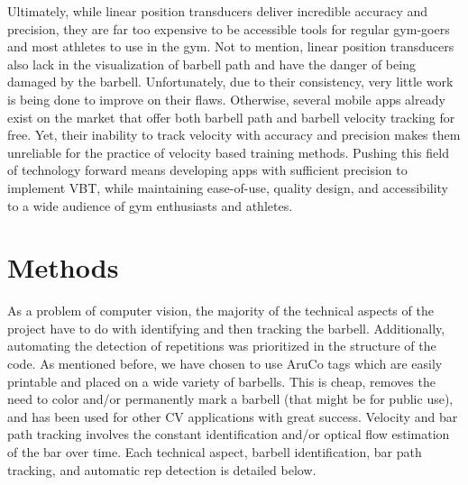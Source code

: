 \documentclass[10pt,twocolumn]{article}
\begin{document}
Ultimately, while linear position transducers deliver incredible accuracy and precision, they are far too expensive to be accessible tools for regular gym-goers and most athletes to use in the gym.
Not to mention, linear position transducers also lack in the visualization of barbell path and have the danger of being damaged by the barbell.
Unfortunately, due to their consistency, very little work is being done to improve on their flaws. 
Otherwise, several mobile apps already exist on the market that offer both barbell path and barbell velocity tracking for free.
Yet, their inability to track velocity with accuracy and precision makes them unreliable for the practice of velocity based training methods.
Pushing this field of technology forward means developing apps with sufficient precision to implement VBT, while maintaining ease-of-use, quality design, and accessibility to a wide audience of gym enthusiasts and athletes.

\section{Methods}
As a problem of computer vision, the majority of the technical aspects of the project have to do with identifying and then tracking the barbell.
Additionally, automating the detection of repetitions was prioritized in the structure of the code.
As mentioned before, we have chosen to use AruCo tags which are easily printable and placed on a wide variety of barbells. 
This is cheap, removes the need to color and/or permanently mark a barbell (that might be for public use), and has been used for other CV applications with great success. 
Velocity and bar path tracking involves the constant identification and/or optical flow estimation of the bar over time.
Each technical aspect, barbell identification, bar path tracking, and automatic rep detection is detailed below.
\end{document}
